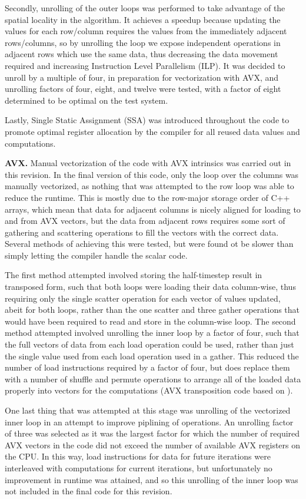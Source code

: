 \documentclass[letterpaper]{article}
\newcommand{\mypar}[1]{{\bf #1.}}
\begin{document}
Secondly, unrolling of the outer loops was performed to take advantage of the spatial locality in the algorithm. It achieves a speedup because updating the values for each row/column requires the values from the immediately adjacent rows/columns, so by unrolling the loop we expose independent operations in adjacent rows which use the same data, thus decreasing the data movement required and increasing Instruction Level Parallelism (ILP). It was decided to unroll by a multiple of four, in preparation for vectorization with AVX, and unrolling factors of four, eight, and twelve were tested, with a factor of eight determined to be optimal on the test system.

Lastly, Single Static Assignment (SSA) was introduced throughout the code to promote optimal register allocation by the compiler for all reused data values and computations.

\mypar{AVX}
Manual vectorization of the code with AVX intrinsics was carried out in this revision. In the final version of this code, only the loop over the columns was manually vectorized, as nothing that was attempted to the row loop was able to reduce the runtime. This is mostly due to the row-major storage order of C++ arrays, which mean that data for adjacent columns is nicely aligned for loading to and from AVX vectors, but the data from adjacent rows requires some sort of gathering and scattering operations to fill the vectors with the correct data. Several methods of achieving this were tested, but were found ot be slower than simply letting the compiler handle the scalar code.

The first method attempted involved storing the half-timestep result in transposed form, such that both loops were loading their data column-wise, thus requiring only the single scatter operation for each vector of values updated, abeit for both loops, rather than the one scatter and three gather operations that would have been required to read and store in the column-wise loop. The second method attempted involved unrolling the inner loop by a factor of four, such that the full vectors of data from each load operation could be used, rather than just the single value used from each load operation used in a gather. This reduced the number of load instructions required by a factor of four, but does replace them with a number of shuffle and permute operations to arrange all of the loaded data properly into vectors for the computations (AVX transposition code based on \cite{transpose}).

One last thing that was attempted at this stage was unrolling of the vectorized inner loop in an attempt to improve piplining of operations. An unrolling factor of three was selected as it was the largest factor for which the number of required AVX vectors in the code did not exceed the number of available AVX registers on the CPU. In this way, load instructions for data for future iterations were interleaved with computations for current iterations, but unfortunately no improvement in runtime was attained, and so this unrolling of the inner loop was not included in the final code for this revision.
\end{document}
